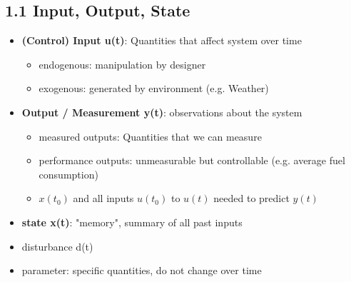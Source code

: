 \subsection{1.1 Input, Output, State}
    \begin{itemize}
        \item \textbf{(Control) Input u(t)}: Quantities that affect system over time
        \begin{itemize}
            \item endogenous: manipulation by designer
            \item exogenous: generated by environment (e.g. Weather)
        \end{itemize}
        \item \textbf{Output / Measurement y(t)}: observations about the system
        \begin{itemize}
            \item measured outputs: Quantities that we can measure
            \item performance outputs: unmeasurable but controllable (e.g. average fuel consumption)
            \item $x(t_0)$ and all inputs $u(t_0)$ to $u(t)$ needed to predict $y(t)$
        \end{itemize}
        \item \textbf{state x(t)}: "memory", summary of all past inputs
        \item disturbance d(t)
        \item parameter: specific quantities, do not change over time
\end{itemize}